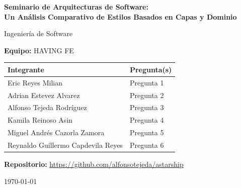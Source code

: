\documentclass[12pt,a4paper]{article}
\begin{document}
\begin{titlepage}
  \centering
  {\Large \textbf{Seminario de Arquitecturas de Software:\\
  Un Análisis Comparativo de Estilos Basados en Capas y Dominio}\par}
  \vspace{1.5cm}
  {\large Ingeniería de Software\par}
  \vspace{1cm}
  {\large \textbf{Equipo:} HAVING FE\par}
  \vspace{1.5cm}

  \begin{tabular}{p{7cm}p{6cm}}
    \hline
    \textbf{Integrante} & \textbf{Pregunta(s)} \\
    \hline
    Eric Reyes Milian & Pregunta 1 \\
    Adrian Estevez Alvarez & Pregunta 2 \\
    Alfonso Tejeda Rodríguez & Pregunta 3 \\
    Kamila Reinoso Asin  & Pregunta 4 \\
    Miguel Andrés Cazorla Zamora  & Pregunta 5 \\
    Reynaldo Guillermo Capdevila Reyes & Pregunta 6 \\
    \hline
  \end{tabular}

  \vspace{1.5cm}
  \textbf{Repositorio:} \url{https://github.com/alfonsotejeda/astarship}
  \vfill
  {\large \today\par}
\end{titlepage}

\tableofcontents
\newpage








\newpage
\printbibliography[title={Referencias}]

\end{document}
